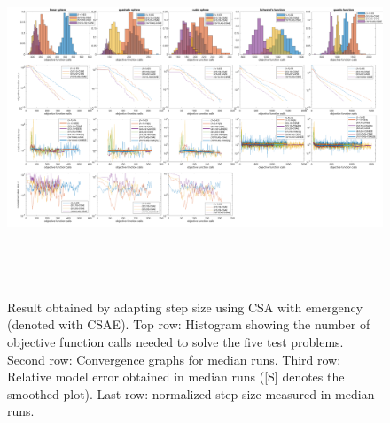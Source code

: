 \begin{center}
\begin{figure}
\includegraphics[height=4.2in, width=6in]{merged_plot_emergency_modified}
\caption{Result obtained by adapting step size using CSA with emergency (denoted with CSAE). Top row: Histogram showing the number of objective function calls needed to solve the five test problems. Second row: Convergence graphs for median runs. Third row: Relative model error obtained in median runs ([S] denotes the smoothed plot). Last row: normalized step size measured in median runs. }
\label{fig:merged_plot_emergency}
\end{figure}
\end{center}


